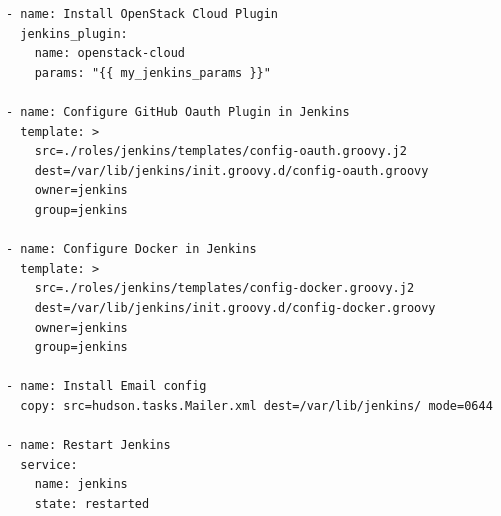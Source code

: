 \documentclass[10pt,letterpaper,onecolumn,draftclsnofoot]{IEEEtran}
\begin{document}
\begin{lstlisting}[caption=Jenkins Task]
- name: Install OpenStack Cloud Plugin
  jenkins_plugin:
    name: openstack-cloud 
    params: "{{ my_jenkins_params }}"

- name: Configure GitHub Oauth Plugin in Jenkins
  template: >
    src=./roles/jenkins/templates/config-oauth.groovy.j2
    dest=/var/lib/jenkins/init.groovy.d/config-oauth.groovy
    owner=jenkins
    group=jenkins

- name: Configure Docker in Jenkins
  template: >
    src=./roles/jenkins/templates/config-docker.groovy.j2
    dest=/var/lib/jenkins/init.groovy.d/config-docker.groovy
    owner=jenkins
    group=jenkins

- name: Install Email config
  copy: src=hudson.tasks.Mailer.xml dest=/var/lib/jenkins/ mode=0644

- name: Restart Jenkins 
  service:
    name: jenkins
    state: restarted
\end{lstlisting}
\end{document}
